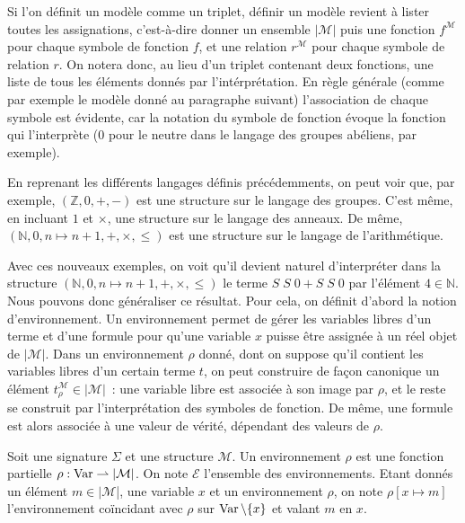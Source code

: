 \begin{remark}
  Si l'on définit un modèle comme un triplet, définir un modèle revient à lister
  toutes les assignations, c'est-à-dire donner un ensemble $|\mathcal M|$ puis
  une fonction $f^\mathcal M$ pour chaque symbole de fonction $f$, et
  une relation $r^\mathcal M$ pour chaque symbole de relation $r$. On
  notera donc, au lieu d'un triplet contenant deux fonctions, une liste de
  tous les éléments donnés par l'intérprétation. En règle générale (comme par
  exemple le modèle donné au paragraphe suivant) l'association de chaque symbole
  est évidente, car la notation du symbole de fonction évoque la fonction qui
  l'interprète ($0$ pour le neutre dans le langage des groupes abéliens, par
  exemple).
\end{remark}

\begin{example}
  En reprenant les différents langages définis précédemments, on peut voir que,
  par exemple, $(\mathbb Z,0,+,-)$ est une structure sur le langage des groupes.
  C'est même, en incluant $1$ et $\times$, une structure sur le langage des
  anneaux. De même, $(\mathbb N,0,n\mapsto n + 1,+,\times,\leq)$ est une
  structure sur le langage de l'arithmétique.
\end{example}

Avec ces nouveaux exemples, on voit qu'il devient naturel d'interpréter dans la
structure $(\mathbb N,0,n\mapsto n+1,+,\times,\leq)$ le terme
$S\;S\;0 + S\;S\;0$
par l'élément $4\in\mathbb N$. Nous pouvons donc généraliser ce résultat. Pour
cela, on définit d'abord la notion d'environnement. Un environnement permet de
gérer les variables libres d'un terme et d'une formule pour qu'une variable $x$
puisse être assignée à un réel objet de $|\mathcal M|$. Dans un environnement
$\rho$ donné, dont on suppose qu'il contient les variables libres d'un certain
terme $t$, on peut construire de façon canonique un élément
$t^\mathcal M_\rho \in |\mathcal M|$~: une variable libre est associée à son
image par $\rho$, et le reste se construit par l'interprétation des symboles
de fonction. De même, une formule est alors associée à une valeur de vérité,
dépendant des valeurs de $\rho$.

\begin{definition}[Environnement]
  Soit une signature $\Sigma$ et une structure $\mathcal M$. Un environnement
  $\rho$ est une fonction partielle $\rho : \operatorname{Var}\rightharpoonup |\mathcal M|$. On
  note $\mathcal E$ l'ensemble des environnements. Etant donnés un élément
  $m\in|\mathcal M$|, une variable $x$ et un environnement $\rho$, on note
  $\rho[x \mapsto m]$ l'environnement coïncidant avec $\rho$ sur
  $\operatorname{Var}\backslash\{x\}$ et valant $m$ en $x$.
\end{definition}

